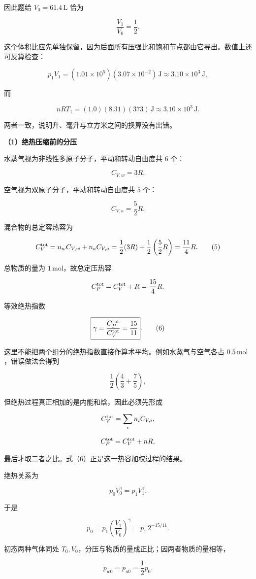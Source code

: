 \documentclass[12pt,a4paper,UTF8]{ctexart}
\begin{document}
因此题给 \(V_0=61.4\,\mathrm L\) 恰为

\[\frac{V_1}{V_0}=\frac12. \tag{4}\]

这个体积比应先单独保留，因为后面所有压强比和饱和节点都由它导出。数值上还可反算检查：

\[p_1V_1
=(1.01\times10^5)(3.07\times10^{-2})\,\mathrm J
\approx3.10\times10^3\,\mathrm J,\]

而

\[nRT_1
=(1.0)(8.31)(373)\,\mathrm J
\approx3.10\times10^3\,\mathrm J.\]

两者一致，说明升、毫升与立方米之间的换算没有出错。

\textbf{（1）绝热压缩前的分压}

水蒸气视为非线性多原子分子，平动和转动自由度共 \(6\) 个：

\[C_{V,w}=3R.\]

空气视为双原子分子，平动和转动自由度共 \(5\) 个：

\[C_{V,a}=\frac52R.\]

混合物的总定容热容为

\[C_V^{\rm tot}=n_wC_{V,w}+n_aC_{V,a}
=\frac12(3R)+\frac12\left(\frac52R\right)
=\frac{11}{4}R. \tag{5}\]

总物质的量为 \(1\,\mathrm{mol}\)，故总定压热容

\[C_P^{\rm tot}=C_V^{\rm tot}+R=\frac{15}{4}R.\]

等效绝热指数

\[\boxed{\gamma=\frac{C_P^{\rm tot}}{C_V^{\rm tot}}=\frac{15}{11}}. \tag{6}\]

这里不能把两个组分的绝热指数直接作算术平均。例如水蒸气与空气各占
\(0.5\,\mathrm{mol}\)，错误做法会得到

\[\frac12\left(\frac43+\frac75\right),\]

但绝热过程真正相加的是内能和焓，因此必须先形成

\[C_V^{\rm tot}=\sum_i n_iC_{V,i},\]

\[C_P^{\rm tot}=C_V^{\rm tot}+nR,\]

最后才取二者之比。式（6）正是这一热容加权过程的结果。

绝热关系为

\[p_0V_0^\gamma=p_1V_1^\gamma.\]

于是

\[p_0=p_1\left(\frac{V_1}{V_0}\right)^\gamma
=p_1\,2^{-15/11}. \tag{7}\]

初态两种气体同处 \(T_0,V_0\)，分压与物质的量成正比；因两者物质的量相等，

\[p_{w0}=p_{a0}=\frac12p_0.\]
\end{document}
